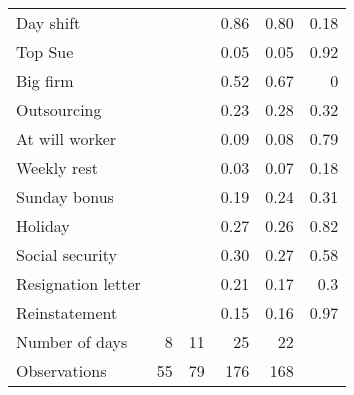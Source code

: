 \begin{tabular}{lrrrrc}
Day shift &       &       & 0.86  & 0.80  & \multicolumn{1}{r}{0.18} \\
Top Sue &       &       & 0.05  & 0.05  & \multicolumn{1}{r}{0.92} \\
Big firm &       &       & 0.52  & 0.67  & \multicolumn{1}{r}{0} \\
Outsourcing  &       &       & 0.23  & 0.28  & \multicolumn{1}{r}{0.32} \\
At will worker &       &       & 0.09  & 0.08  & \multicolumn{1}{r}{0.79} \\
Weekly rest &       &       & 0.03  & 0.07  & \multicolumn{1}{r}{0.18} \\
Sunday bonus &       &       & 0.19  & 0.24  & \multicolumn{1}{r}{0.31} \\
Holiday &       &       & 0.27  & 0.26  & \multicolumn{1}{r}{0.82} \\
Social security &       &       & 0.30  & 0.27  & \multicolumn{1}{r}{0.58} \\
Resignation letter &       &       & 0.21  & 0.17  & \multicolumn{1}{r}{0.3} \\
Reinstatement &       &       & 0.15  & 0.16  & \multicolumn{1}{r}{0.97} \\
Number of days & 8     & 11    & 25    & 22    &  \\
\midrule
Observations & 55    & 79    & 176   & 168   &  \\
\bottomrule
\bottomrule
\end{tabular}%
